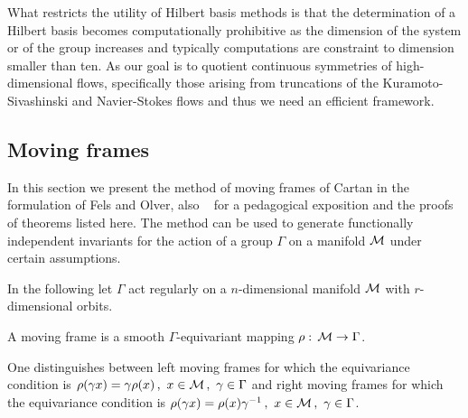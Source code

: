 What restricts the utility of Hilbert basis methods is that the determination of a Hilbert basis becomes computationally prohibitive as the dimension of the system or of the group increases\cite{gatermannHab,ChossLaut00} and typically computations are constraint to dimension smaller than ten. As our goal is to quotient continuous symmetries of high-dimensional flows, specifically those arising from truncations of the Kuramoto-Sivashinski and Navier-Stokes flows and thus we need an efficient
framework.


\subsection{Moving frames}
\label{sec:mf}

In this section we present the method of moving frames
of Cartan \cite{CartanMF} in the formulation of Fels and Olver, also \cf~ for
a pedagogical exposition and the proofs of theorems listed here. The method can be used to generate functionally independent invariants for the action of a group $\Gamma$ on a manifold $\mathcal{M}$ under certain assumptions. 

In the following let $\Gamma$ act regularly on a $n$-dimensional manifold $\mathcal{M}$ with $r$-dimensional orbits.
\begin{definition}
 A moving frame is a smooth $\Gamma$-equivariant mapping $\rho:\,\mathcal{M} \rightarrow \Gamma$.
\end{definition}
One distinguishes between left moving frames for which the equivariance condition is $\rho(\gamma x)=\gamma\rho(x)\,,\ x\in\mathcal{M}\,,\ \gamma\in\Gamma$ and right moving frames for which the equivariance condition is $\rho(\gamma x)=\rho(x)\gamma^{-1}\,,\ x\in\Manif\,,\ \gamma\in\Gamma$.

